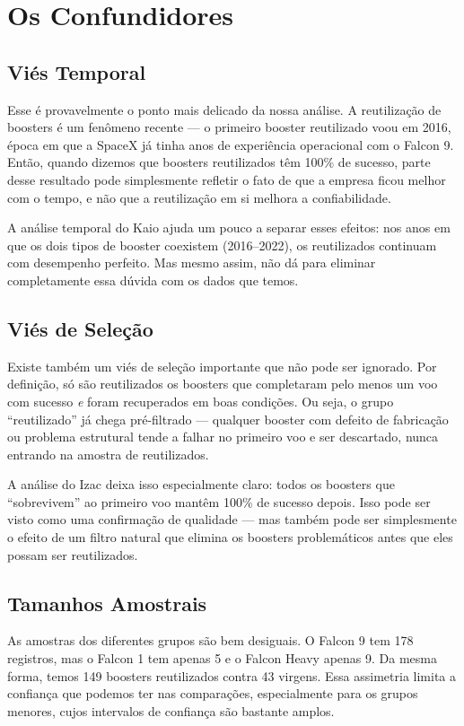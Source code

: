 \section{Os Confundidores}

\subsection{Viés Temporal}

Esse é provavelmente o ponto mais delicado da nossa análise. A reutilização de boosters é um fenômeno recente — o primeiro booster reutilizado voou em 2016, época em que a SpaceX já tinha anos de experiência operacional com o Falcon 9. Então, quando dizemos que boosters reutilizados têm 100\% de sucesso, parte desse resultado pode simplesmente refletir o fato de que a empresa ficou melhor com o tempo, e não que a reutilização em si melhora a confiabilidade.

A análise temporal do Kaio ajuda um pouco a separar esses efeitos: nos anos em que os dois tipos de booster coexistem (2016--2022), os reutilizados continuam com desempenho perfeito. Mas mesmo assim, não dá para eliminar completamente essa dúvida com os dados que temos.

\subsection{Viés de Seleção}

Existe também um viés de seleção importante que não pode ser ignorado. Por definição, só são reutilizados os boosters que completaram pelo menos um voo com sucesso \textit{e} foram recuperados em boas condições. Ou seja, o grupo ``reutilizado'' já chega pré-filtrado — qualquer booster com defeito de fabricação ou problema estrutural tende a falhar no primeiro voo e ser descartado, nunca entrando na amostra de reutilizados.

A análise do Izac deixa isso especialmente claro: todos os boosters que ``sobrevivem'' ao primeiro voo mantêm 100\% de sucesso depois. Isso pode ser visto como uma confirmação de qualidade — mas também pode ser simplesmente o efeito de um filtro natural que elimina os boosters problemáticos antes que eles possam ser reutilizados.

\subsection{Tamanhos Amostrais}

As amostras dos diferentes grupos são bem desiguais. O Falcon 9 tem 178 registros, mas o Falcon 1 tem apenas 5 e o Falcon Heavy apenas 9. Da mesma forma, temos 149 boosters reutilizados contra 43 virgens. Essa assimetria limita a confiança que podemos ter nas comparações, especialmente para os grupos menores, cujos intervalos de confiança são bastante amplos.


